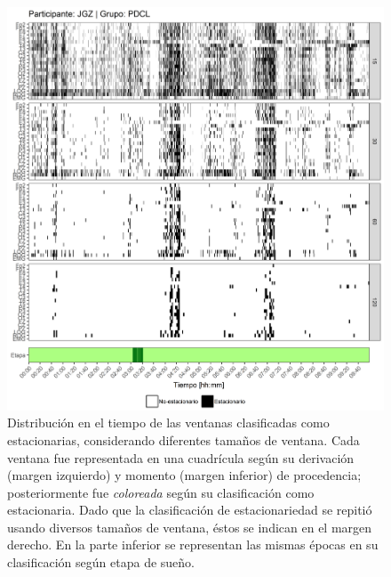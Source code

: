 \documentclass[12pt,letterpaper,draft]{book}
\begin{document}
\begin{figure}
\centering
\includegraphics[width=\linewidth]
{./scripts_graf_res/JGZ_patrones_2.png}
\caption[Distribución en el tiempo de las ventanas clasificadas como estacionarias, considerando diferentes tamaños de ventana]{Distribución en el tiempo de las ventanas clasificadas como estacionarias, considerando diferentes tamaños de ventana. 
Cada ventana fue representada en una cuadrícula según su derivación (margen izquierdo) y momento (margen inferior) de procedencia; posteriormente fue \textit{coloreada} según su clasificación como estacionaria.
Dado que la clasificación de estacionariedad se repitió usando diversos tamaños de ventana, éstos se indican en el margen derecho.
En la parte inferior se representan las mismas épocas en su clasificación según etapa de sueño.}
\end{figure}
\end{document}
